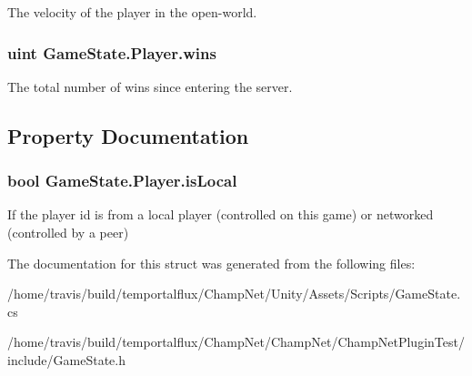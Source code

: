 The velocity of the player in the open-\/world. 

\hypertarget{class_game_state_1_1_player_a3a4d13459cad9bd58e058ddc6387af70}{
\subsubsection[{wins}]{\setlength{\rightskip}{0pt plus 5cm}uint Game\-State.\-Player.\-wins}}\label{class_game_state_1_1_player_a3a4d13459cad9bd58e058ddc6387af70}


The total number of wins since entering the server. 



\subsection{Property Documentation}
\hypertarget{class_game_state_1_1_player_affd7c601a6d763dafdc59a58c415e9e7}{
\subsubsection[{is\-Local}]{\setlength{\rightskip}{0pt plus 5cm}bool Game\-State.\-Player.\-is\-Local\hspace{0.3cm}{\ttfamily [get]}}}\label{class_game_state_1_1_player_affd7c601a6d763dafdc59a58c415e9e7}


If the player id is from a local player (controlled on this game) or networked (controlled by a peer) 



The documentation for this struct was generated from the following files\-:\begin{DoxyCompactItemize}
\item 
/home/travis/build/temportalflux/\-Champ\-Net/\-Unity/\-Assets/\-Scripts/Game\-State.\-cs\item 
/home/travis/build/temportalflux/\-Champ\-Net/\-Champ\-Net/\-Champ\-Net\-Plugin\-Test/include/Game\-State.\-h\end{DoxyCompactItemize}
